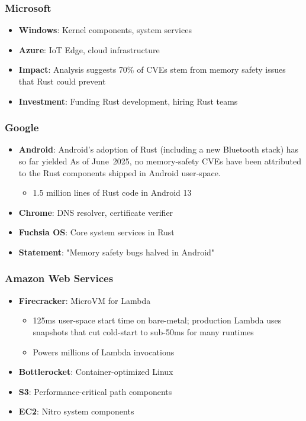 \documentclass[11pt]{article}
\begin{document}
\subsubsection{Microsoft}
\begin{itemize}
    \item \textbf{Windows}: Kernel components, system services
    \item \textbf{Azure}: IoT Edge, cloud infrastructure
    \item \textbf{Impact}: Analysis suggests 70\% of CVEs stem from memory safety issues that Rust could prevent~\cite{msrc2019trends}
    \item \textbf{Investment}: Funding Rust development, hiring Rust teams
\end{itemize}

\subsubsection{Google}
\begin{itemize}
    \item \textbf{Android}: Android's adoption of Rust (including a new Bluetooth stack) has so far yielded As of June~2025, no memory‑safety CVEs have been attributed to the Rust components shipped in Android user‑space.
    \begin{itemize}
        \item 1.5 million lines of Rust code in Android 13
    \end{itemize}
    \item \textbf{Chrome}: DNS resolver, certificate verifier
    \item \textbf{Fuchsia OS}: Core system services in Rust
    \item \textbf{Statement}: "Memory safety bugs halved in Android"~\cite{google2023memory}
\end{itemize}

\subsubsection{Amazon Web Services}
\begin{itemize}
    \item \textbf{Firecracker}: MicroVM for Lambda
    \begin{itemize}
        \item 125ms user-space start time on bare-metal; production Lambda uses snapshots that cut cold-start to sub-50ms for many runtimes~\cite{aws2019firecracker}
        \item Powers millions of Lambda invocations
    \end{itemize}
    \item \textbf{Bottlerocket}: Container-optimized Linux
    \item \textbf{S3}: Performance-critical path components
    \item \textbf{EC2}: Nitro system components
\end{itemize}
\end{document}
